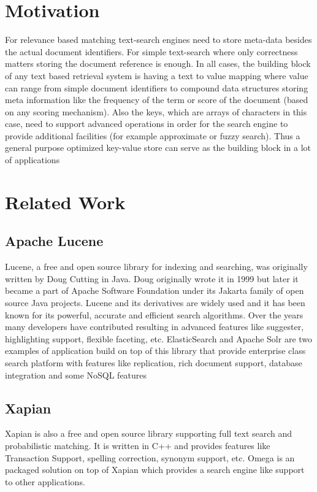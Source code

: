 \section{Motivation}
For relevance based matching text-search engines need to store meta-data besides the actual document identifiers.
For simple text-search where only correctness matters storing the document reference is enough.
In all cases, the building block of any text based retrieval system is having a text to value mapping where
value can range from simple document identifiers to compound data structures storing meta information like the frequency
of the term or score of the document (based on any scoring mechanism).
Also the keys, which are arrays of characters in this case, need to support advanced operations in order for
the search engine to provide additional facilities (for example approximate or fuzzy search).
Thus a general purpose optimized key-value store can serve as the building block in a lot of applications

\section{Related Work}

\subsection{Apache Lucene}
Lucene, a free and open source library for indexing and searching, was originally written by Doug Cutting\cite{goetz2000lucene}
in Java. Doug originally wrote it in 1999 but later it became a part of Apache Software Foundation under its Jakarta family
of open source Java projects.
Lucene and its derivatives are widely used and it has been known for its powerful, accurate and efficient search algorithms.
Over the years many developers have contributed resulting in advanced features like suggester, highlighting support, flexible faceting, etc.
ElasticSearch and Apache Solr are two examples of application build on top of this library that provide enterprise class search
platform with features like replication, rich document support, database integration and some NoSQL features

\subsection{Xapian}
Xapian is also a free and open source library supporting full text search and probabilistic matching.
It is written in C++ and provides features like Transaction Support, spelling correction, synonym support, etc.
Omega is an packaged solution on top of Xapian which provides a search engine like support to other applications.

